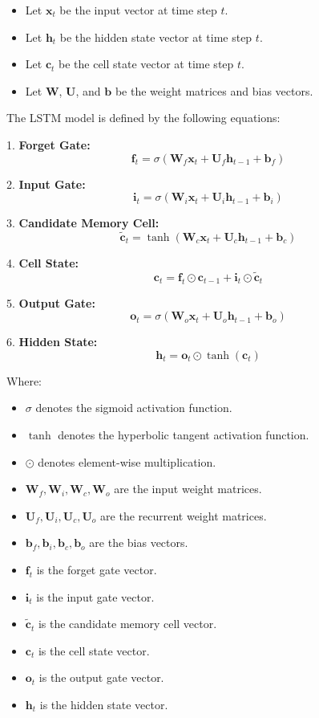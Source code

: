 \documentclass{ieeeojies}
\begin{document}
\begin{itemize}
    \item Let $\mathbf{x}_t$ be the input vector at time step $t$.
    \item Let $\mathbf{h}_t$ be the hidden state vector at time step $t$.
    \item Let $\mathbf{c}_t$ be the cell state vector at time step $t$.
    \item Let $\mathbf{W}$, $\mathbf{U}$, and $\mathbf{b}$ be the weight matrices and bias vectors.
\end{itemize}

The LSTM model is defined by the following equations:

1. \textbf{Forget Gate:}
\[
\mathbf{f}_t = \sigma(\mathbf{W}_f \mathbf{x}_t + \mathbf{U}_f \mathbf{h}_{t-1} + \mathbf{b}_f)
\]

2. \textbf{Input Gate:}
\[
\mathbf{i}_t = \sigma(\mathbf{W}_i \mathbf{x}_t + \mathbf{U}_i \mathbf{h}_{t-1} + \mathbf{b}_i)
\]

3. \textbf{Candidate Memory Cell:}
\[
\mathbf{\tilde{c}}_t = \tanh(\mathbf{W}_c \mathbf{x}_t + \mathbf{U}_c \mathbf{h}_{t-1} + \mathbf{b}_c)
\]

4. \textbf{Cell State:}
\[
\mathbf{c}_t = \mathbf{f}_t \odot \mathbf{c}_{t-1} + \mathbf{i}_t \odot \mathbf{\tilde{c}}_t
\]

5. \textbf{Output Gate:}
\[
\mathbf{o}_t = \sigma(\mathbf{W}_o \mathbf{x}_t + \mathbf{U}_o \mathbf{h}_{t-1} + \mathbf{b}_o)
\]

6. \textbf{Hidden State:}
\[
\mathbf{h}_t = \mathbf{o}_t \odot \tanh(\mathbf{c}_t)
\]

Where:
\begin{itemize}
    \item $\sigma$ denotes the sigmoid activation function.
    \item $\tanh$ denotes the hyperbolic tangent activation function.
    \item $\odot$ denotes element-wise multiplication.
    \item $\mathbf{W}_f, \mathbf{W}_i, \mathbf{W}_c, \mathbf{W}_o$ are the input weight matrices.
    \item $\mathbf{U}_f, \mathbf{U}_i, \mathbf{U}_c, \mathbf{U}_o$ are the recurrent weight matrices.
    \item $\mathbf{b}_f, \mathbf{b}_i, \mathbf{b}_c, \mathbf{b}_o$ are the bias vectors.
    \item $\mathbf{f}_t$ is the forget gate vector.
    \item $\mathbf{i}_t$ is the input gate vector.
    \item $\mathbf{\tilde{c}}_t$ is the candidate memory cell vector.
    \item $\mathbf{c}_t$ is the cell state vector.
    \item $\mathbf{o}_t$ is the output gate vector.
    \item $\mathbf{h}_t$ is the hidden state vector.
\end{itemize}
\end{document}
